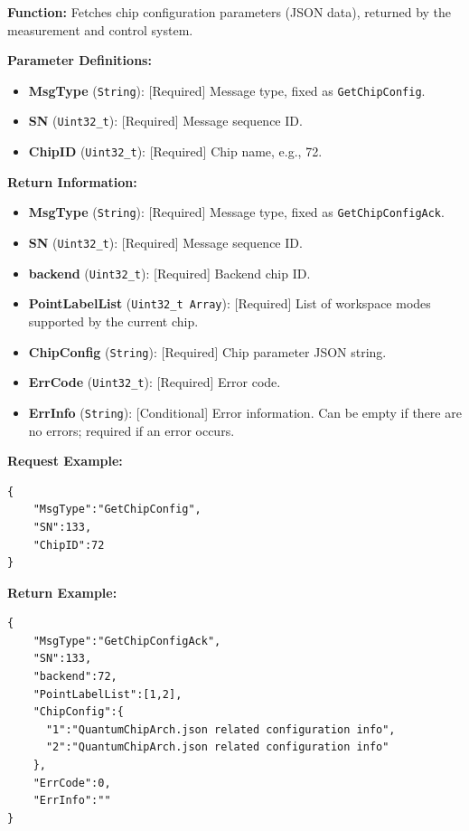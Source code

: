 \documentclass[12pt, a4paper]{article}
\begin{document}
\textbf{Function:} Fetches chip configuration parameters (JSON data), returned by the measurement and control system.

\textbf{Parameter Definitions:}
\begin{itemize}
    \item \textbf{MsgType} (\texttt{String}): [Required] Message type, fixed as \texttt{GetChipConfig}.
    \item \textbf{SN} (\texttt{Uint32\_t}): [Required] Message sequence ID.
    \item \textbf{ChipID} (\texttt{Uint32\_t}): [Required] Chip name, e.g., 72.
\end{itemize}

\textbf{Return Information:}
\begin{itemize}
    \item \textbf{MsgType} (\texttt{String}): [Required] Message type, fixed as \texttt{GetChipConfigAck}.
    \item \textbf{SN} (\texttt{Uint32\_t}): [Required] Message sequence ID.
    \item \textbf{backend} (\texttt{Uint32\_t}): [Required] Backend chip ID.
    \item \textbf{PointLabelList} (\texttt{Uint32\_t Array}): [Required] List of workspace modes supported by the current chip.
    \item \textbf{ChipConfig} (\texttt{String}): [Required] Chip parameter JSON string.
    \item \textbf{ErrCode} (\texttt{Uint32\_t}): [Required] Error code.
    \item \textbf{ErrInfo} (\texttt{String}): [Conditional] Error information. Can be empty if there are no errors; required if an error occurs.
\end{itemize}

\noindent \textbf{Request Example:}
\begin{lstlisting}
{
    "MsgType":"GetChipConfig",
    "SN":133,
    "ChipID":72
}
\end{lstlisting}

\noindent \textbf{Return Example:}
\begin{lstlisting}
{
    "MsgType":"GetChipConfigAck",
    "SN":133,
    "backend":72,
    "PointLabelList":[1,2],
    "ChipConfig":{
      "1":"QuantumChipArch.json related configuration info",
      "2":"QuantumChipArch.json related configuration info"
    },
    "ErrCode":0,
    "ErrInfo":""
}
\end{lstlisting}
\end{document}

